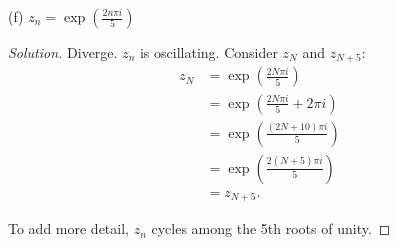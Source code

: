 \begin{enumerate}
(f) $z_n=\exp \left(\frac{2 n \pi i}{5}\right)$
\begin{proof}[Solution]
Diverge. $z_n$ is oscillating. Consider $z_N$ and $z_{N+5}$:
\begin{align*}
	z_N &= \exp \left( \frac{2 N \pi i}{5} \right)  \\
	 &= \exp \left( \frac{2 N \pi i}{5} + 2 \pi i \right)  \\
	 &= \exp \left( \frac{(2 N + 10) \pi i}{5}  \right)  \\
	 &= \exp \left( \frac{2 (N + 5) \pi i}{5}  \right)  \\
	 &= z_{N+5}
.\end{align*}

To add more detail, $z_n$ cycles among the 5th roots of unity.
\end{proof}

\end{enumerate}
